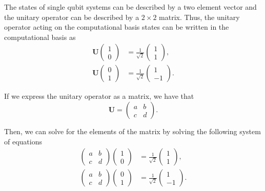 \documentclass[12pt]{article}
\begin{document}
    The states of single qubit systems can be described by a two element vector and the unitary operator can be described by a $2 \times 2$ matrix. Thus, the unitary operator acting on the computational basis states can be written in the computational basis as
    \begin{align*}
        \mathbf{U} \begin{pmatrix} 1 \\ 0\end{pmatrix} &= \frac{1}{\sqrt{2}} \begin{pmatrix} 1 \\ 1 \end{pmatrix}, \\
        \mathbf{U} \begin{pmatrix} 0 \\ 1 \end{pmatrix} &= \frac{1}{\sqrt{2}} \begin{pmatrix} 1 \\ -1 \end{pmatrix}.
    \end{align*}

    If we express the unitary operator as a matrix, we have that
    \begin{equation*}
        \mathbf{U} = \begin{pmatrix} a & b \\ c & d \end{pmatrix}.
    \end{equation*}

    Then, we can solve for the elements of the matrix by solving the following system of equations
    \begin{align*}
        \begin{pmatrix} a & b \\ c & d \end{pmatrix} \begin{pmatrix} 1 \\ 0 \end{pmatrix} &= \frac{1}{\sqrt{2}} \begin{pmatrix} 1 \\ 1 \end{pmatrix}, \\
        \begin{pmatrix} a & b \\ c & d \end{pmatrix} \begin{pmatrix} 0 \\ 1 \end{pmatrix} &= \frac{1}{\sqrt{2}} \begin{pmatrix} 1 \\ -1 \end{pmatrix}.
    \end{align*}
\end{document}
